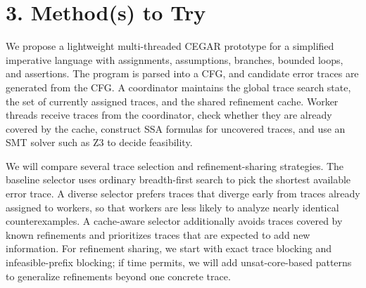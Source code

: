 \documentclass[11pt, a4paper]{article}
\begin{document}
\section*{3. Method(s) to Try}
We propose a lightweight multi-threaded CEGAR prototype for a simplified imperative language with assignments, assumptions, branches, bounded loops, and assertions. The program is parsed into a CFG, and candidate error traces are generated from the CFG. A coordinator maintains the global trace search state, the set of currently assigned traces, and the shared refinement cache. Worker threads receive traces from the coordinator, check whether they are already covered by the cache, construct SSA formulas for uncovered traces, and use an SMT solver such as Z3 to decide feasibility.

We will compare several trace selection and refinement-sharing strategies. The baseline selector uses ordinary breadth-first search to pick the shortest available error trace. A diverse selector prefers traces that diverge early from traces already assigned to workers, so that workers are less likely to analyze nearly identical counterexamples. A cache-aware selector additionally avoids traces covered by known refinements and prioritizes traces that are expected to add new information. For refinement sharing, we start with exact trace blocking and infeasible-prefix blocking; if time permits, we will add unsat-core-based patterns to generalize refinements beyond one concrete trace.
\end{document}
